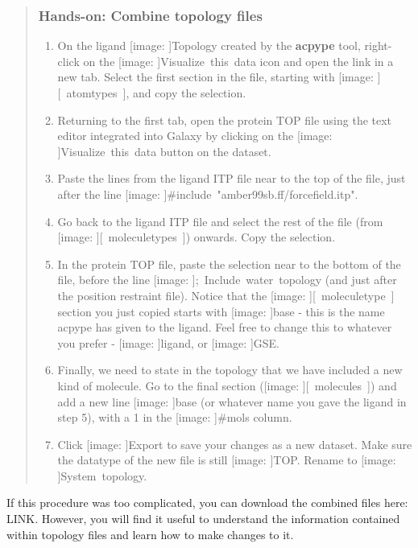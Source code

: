 \documentclass[twocolumn]{bmcart}%
\def\texttt{[image: ]}
\providecommand{\tightlist}{%
  \setlength{\itemsep}{0pt}\setlength{\parskip}{0pt}}
\begin{document}
\begin{quote}
\hypertarget{hands-on-combine-topology-files}{%
\subsubsection{Hands-on: Combine topology
files}\label{hands-on-combine-topology-files}}

\begin{enumerate}
\def\labelenumi{\arabic{enumi}.}
\tightlist
\item
  On the ligand \texttt{Topology} created by the \textbf{acpype} tool,
  right-click on the \texttt{Visualize\ this\ data} icon and open the
  link in a new tab. Select the first section in the file, starting with
  \texttt{{[}\ atomtypes\ {]}}, and copy the selection.
\item
  Returning to the first tab, open the protein TOP file using the text
  editor integrated into Galaxy by clicking on the
  \texttt{Visualize\ this\ data} button on the dataset.
\item
  Paste the lines from the ligand ITP file near to the top of the file,
  just after the line \texttt{\#include\ "amber99sb.ff/forcefield.itp"}.
\item
  Go back to the ligand ITP file and select the rest of the file (from
  \texttt{{[}\ moleculetypes\ {]}}) onwards. Copy the selection.
\item
  In the protein TOP file, paste the selection near to the bottom of the
  file, before the line \texttt{;\ Include\ water\ topology} (and just
  after the position restraint file). Notice that the
  \texttt{{[}\ moleculetype\ {]}} section you just copied starts with
  \texttt{base} - this is the name acpype has given to the ligand. Feel
  free to change this to whatever you prefer - \texttt{ligand}, or
  \texttt{GSE}.
\item
  Finally, we need to state in the topology that we have included a new
  kind of molecule. Go to the final section
  (\texttt{{[}\ molecules\ {]}}) and add a new line \texttt{base} (or
  whatever name you gave the ligand in step 5), with a 1 in the
  \texttt{\#mols} column.
\item
  Click \texttt{Export} to save your changes as a new dataset. Make sure
  the datatype of the new file is still \texttt{TOP}. Rename to
  \texttt{System\ topology}. 
\end{enumerate}
\end{quote}

If this procedure was too complicated, you can download the combined
files here: LINK. However, you will find it useful to understand the
information contained within topology files and learn how to make
changes to it.
\end{document}
